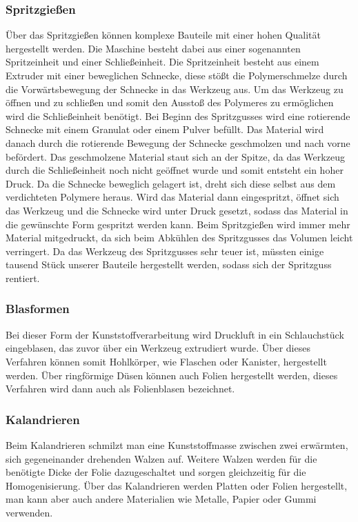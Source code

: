 \subsubsection{Spritzgießen}
Über das Spritzgießen können komplexe Bauteile mit einer hohen Qualität hergestellt werden.
Die Maschine besteht dabei aus einer sogenannten Spritzeinheit und einer Schließeinheit.
Die Spritzeinheit besteht aus einem Extruder mit einer beweglichen Schnecke, diese stößt die Polymerschmelze durch die Vorwärtsbewegung der Schnecke in das Werkzeug aus.
Um das Werkzeug zu öffnen und zu schließen und somit den Ausstoß des Polymeres zu ermöglichen wird die Schließeinheit
benötigt.
Bei Beginn des Spritzgusses wird eine rotierende Schnecke mit einem Granulat oder einem Pulver befüllt.
Das Material wird danach durch die rotierende Bewegung der Schnecke geschmolzen und nach vorne befördert.
Das geschmolzene Material staut sich an der Spitze, da das Werkzeug durch die Schließeinheit noch nicht geöffnet wurde und somit entsteht ein hoher Druck.
Da die Schnecke beweglich gelagert ist, dreht sich diese selbst aus dem verdichteten Polymere heraus.
Wird das Material dann eingespritzt, öffnet sich das Werkzeug und die Schnecke wird unter Druck gesetzt, sodass das
Material in die gewünschte Form gespritzt werden kann.
Beim Spritzgießen wird immer mehr Material mitgedruckt, da sich beim Abkühlen des Spritzgusses das Volumen leicht
verringert.
Da das Werkzeug des Spritzgusses sehr teuer ist, müssten einige tausend Stück unserer Bauteile hergestellt werden,
sodass sich der Spritzguss rentiert.

\subsubsection{Blasformen}
Bei dieser Form der Kunststoffverarbeitung wird Druckluft in ein Schlauchstück eingeblasen, das zuvor über ein Werkzeug
extrudiert wurde.
Über dieses Verfahren können somit Hohlkörper, wie Flaschen oder Kanister, hergestellt werden.
Über ringförmige Düsen können auch Folien hergestellt werden, dieses Verfahren wird dann auch als Folienblasen bezeichnet.

\subsubsection{Kalandrieren}
Beim Kalandrieren schmilzt man eine Kunststoffmasse zwischen zwei erwärmten, sich gegeneinander drehenden Walzen auf.
Weitere Walzen werden für die benötigte Dicke der Folie dazugeschaltet und sorgen gleichzeitig für die Homogenisierung.
Über das Kalandrieren werden Platten oder Folien hergestellt, man kann aber auch andere Materialien wie Metalle, Papier
oder Gummi verwenden.

